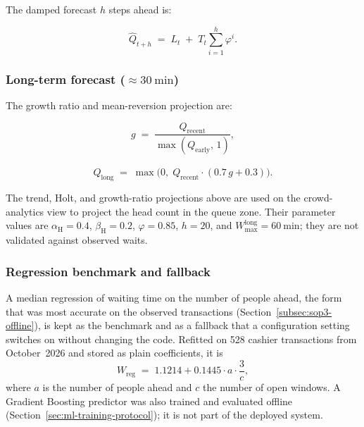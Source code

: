 \noindent The damped forecast $h$ steps ahead is:

\begin{equation}
\hat{Q}_{t+h} \;=\; L_t \;+\; T_t \sum_{i=1}^{h} \varphi^i.
\label{eq:holt-forecast}
\end{equation}

\subsubsection{Long-term forecast ($\approx 30\ \mathrm{min}$)}
\label{subsubsec:long-forecast}

The growth ratio and mean-reversion projection are:

\begin{equation}
g \;=\;
\frac{Q_{\mathrm{recent}}}{\max(Q_{\mathrm{early}},\, 1)},
\label{eq:growth}
\end{equation}

\begin{equation}
\hat{Q}_{\text{long}} \;=\;
\max\!\Big(0,\;
Q_{\mathrm{recent}} \cdot (0.7\,g + 0.3)\Big).
\label{eq:qlong}
\end{equation}

\noindent The trend, Holt, and growth-ratio projections above are used
on the crowd-analytics view to project the head count in the queue zone.
Their parameter values are $\alpha_{\mathrm{H}} = 0.4$,
$\beta_{\mathrm{H}} = 0.2$, $\varphi = 0.85$, $h = 20$, and
$W_{\max}^{\mathrm{long}} = 60\ \mathrm{min}$; they are not validated
against observed waits.

\subsubsection{Regression benchmark and fallback}
\label{subsubsec:wait-regression}

A median regression of waiting time on the number of people ahead, the
form that was most accurate on the observed transactions
(Section~\ref{subsec:sop3-offline}), is kept as the benchmark and as a
fallback that a configuration setting switches on without changing the
code. Refitted on 528 cashier transactions from October~2026 and stored
as plain coefficients, it is
\begin{equation}
W_{\mathrm{reg}} \;=\; 1.1214 + 0.1445 \cdot a \cdot \frac{3}{c},
\label{eq:wait-regression}
\end{equation}
where $a$ is the number of people ahead and $c$ the number of open
windows. A Gradient Boosting predictor was also trained and evaluated
offline (Section~\ref{sec:ml-training-protocol}); it is not part of the
deployed system.

